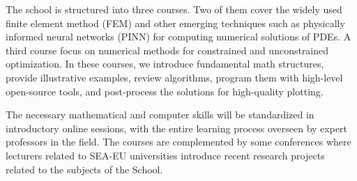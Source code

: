 \documentclass[letterpaper]{inzane_syllabus} %
\begin{document}
The school is structured into three courses. 
Two of them cover the widely used finite element method (FEM) and other emerging techniques such as physically informed neural networks (PINN) for computing numerical solutions of PDEs.
A third course focus on numerical methods for constrained and unconstrained optimization. 
In these courses, we introduce fundamental math structures, provide illustrative examples, review algorithms, program them with high-level open-source tools, and post-process the solutions for high-quality plotting.

The necessary mathematical and computer skills will be standardized in introductory online sessions, with the entire learning process overseen by expert professors in the field.
The courses are complemented by some conferences where lecturers related to SEA-EU universities  introduce recent research projects related to the subjects of the School.


\end{document}
